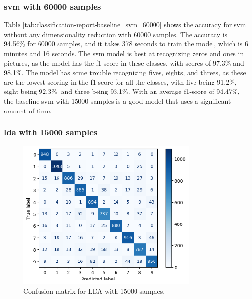 \subsubsection{\gls{svm} with 60000 samples}\label{subsubsec:experiment-1-results-svm-60000}

Table \ref{tab:classification-report-baseline_svm_60000} shows the accuracy for \gls{svm} without any dimensionality reduction with 60000 samples. The accuracy is 94.56\% for 60000 samples, and it takes 378 seconds to train the model, which is 6 minutes and 16 seconds. The \gls{svm} model is best at recognizing zeros and ones in pictures, as the model has the f1-score in these classes, with scores of 97.3\% and 98.1\%. The model has some trouble recognizing fives, eights, and threes, as these are the lowest scoring in the f1-score for all the classes, with five being 91.2\%, eight being 92.3\%, and three being 93.1\%. With an average f1-score of 94.47\%, the baseline \gls{svm} with 15000 samples is a good model that uses a significant amount of time.

\subsubsection{\gls{lda} with 15000 samples}\label{subsubsec:experiment-1-results-lda-15000}




\begin{figure}[htb!]
    \centering
    \includegraphics[width=0.8\textwidth]{figures/1-experiment/confusion_matrix_lda_svm_15000.png}
    \caption{Confusion matrix for LDA with 15000 samples.}
    \label{fig:confusion-matrix-lda-15000}
\end{figure}

